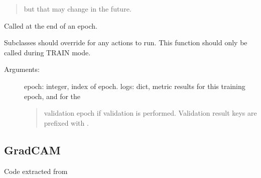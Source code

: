 \documentclass[letterpaper,10pt,english]{sphinxmanual}
\begin{document}
\begin{fulllineitems}
\begin{fulllineitems}
\begin{description}
\begin{quote}
but that may change in the future.
\end{quote}

\end{description}

\end{fulllineitems}


\begin{fulllineitems}
\label{\detokenize{utils/callbacks:utils.callbacks.TimeHistory.on_epoch_end}}
Called at the end of an epoch.

Subclasses should override for any actions to run. This function should only
be called during TRAIN mode.
\begin{description}
\item[{Arguments:}] \leavevmode
epoch: integer, index of epoch.
logs: dict, metric results for this training epoch, and for the
\begin{quote}

validation epoch if validation is performed. Validation result keys
are prefixed with .
\end{quote}

\end{description}

\end{fulllineitems}


\end{fulllineitems}



\subsection{Grad\sphinxhyphen{}CAM}
\label{\detokenize{utils/grad_cam:module-utils.grad_cam}}\label{\detokenize{utils/grad_cam:grad-cam}}\label{\detokenize{utils/grad_cam::doc}}
Code extracted from 
\end{document}
